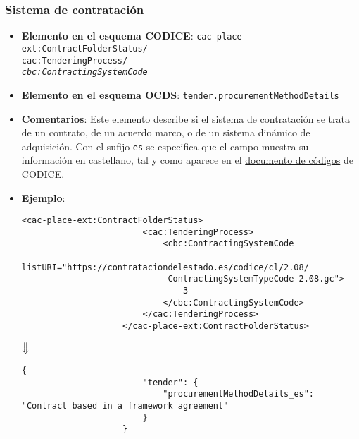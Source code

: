         \subsubsection{Sistema de contratación}
        \begin{itemize}
            \item \textbf{Elemento en el esquema CODICE}:
                \tabto{7.6cm} \texttt{cac-place-ext:ContractFolderStatus/} \\
                \tabto{7.6cm} \texttt{cac:TenderingProcess/} \\
                \tabto{7.6cm} \texttt{\textit{cbc:ContractingSystemCode}}
            \item \textbf{Elemento en el esquema OCDS}:
                \tabto{7.6cm} \texttt{tender.procurementMethodDetails}
            \item \textbf{Comentarios}: Este elemento describe si el sistema de contratación se trata de un contrato, de un acuerdo marco, o de un sistema dinámico de adquisición. Con el sufijo \texttt{es} se especifica que el campo muestra su información en castellano, tal y como aparece en el  \href{https://contrataciondelestado.es/codice/cl/2.08/ContractingSystemTypeCode-2.08.gc}{documento de códigos} de CODICE.
            \item \textbf{Ejemplo}: \\
                \begin{lstlisting}[language=lXML]
                    <cac-place-ext:ContractFolderStatus>
                        <cac:TenderingProcess>
                            <cbc:ContractingSystemCode
                             listURI="https://contrataciondelestado.es/codice/cl/2.08/
                             ContractingSystemTypeCode-2.08.gc">
                                3
                            </cbc:ContractingSystemCode>
                        </cac:TenderingProcess>
                    </cac-place-ext:ContractFolderStatus>
                \end{lstlisting}
                
                \begin{center}
                    $\big\Downarrow$
                \end{center}
                
                \begin{lstlisting}[language=lJSON]
                    {
                        "tender": {
                            "procurementMethodDetails_es": "Contract based in a framework agreement"
                        }
                    }
                \end{lstlisting}
        \end{itemize}
        
